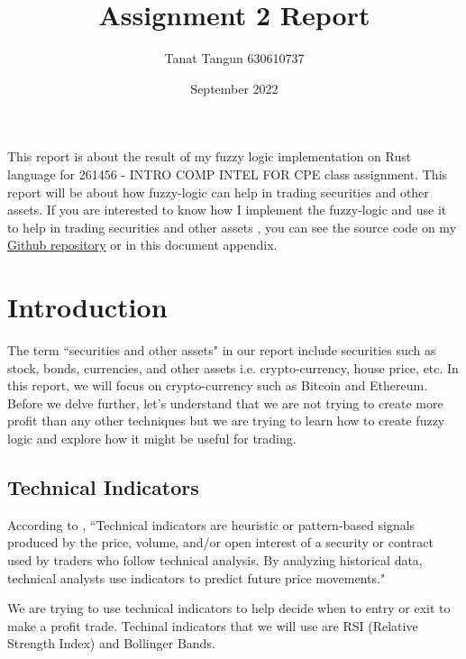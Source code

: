 \documentclass{article}
\title{Assignment 2 Report}
\author{Tanat Tangun 630610737}
\date{September 2022}
\begin{document}
\maketitle
This report is about the result of my fuzzy logic implementation on Rust language for 261456 - INTRO COMP INTEL FOR CPE class
assignment. This report will be about how fuzzy-logic can help in trading securities and other assets. 
If you are interested to know how I implement the fuzzy-logic and use it to help in trading securities and other assets
, you can see the source code on my 
\href{https://github.com/RiwEZ/MLPOnRust}{Github repository} or in this document appendix.

\section*{Introduction}
The term ``securities and other assets" in our report include securities such as stock, bonds, currencies, and other assets
i.e. crypto-currency, house price, etc. In this report, we will focus on crypto-currency such as Bitcoin and Ethereum. Before we delve 
further, let's understand that we are not trying to create more profit than any other techniques but we are trying to learn how
to create fuzzy logic and explore how it might be useful for trading.

\subsection*{Technical Indicators}
According to \cite{technical_indicator}, ``Technical indicators are heuristic or pattern-based signals produced by the price, volume, 
and/or open interest of a security or contract used by traders who follow technical analysis.
By analyzing historical data, technical analysts use indicators to predict future price movements."

We are trying to use technical indicators to help decide when to entry or exit to make a profit trade. Techinal indicators
that we will use are RSI (Relative Strength Index) and Bollinger Bands.
\end{document}
